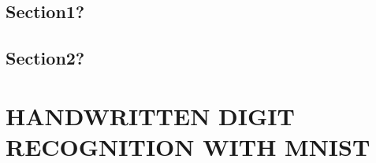 \documentclass[a4paper,twoside]{article}
\begin{document}
\subsection{Section1?}


\subsection{Section2?}



\section{\uppercase{Handwritten Digit Recognition with MNIST}}


\vfill
\end{document}
